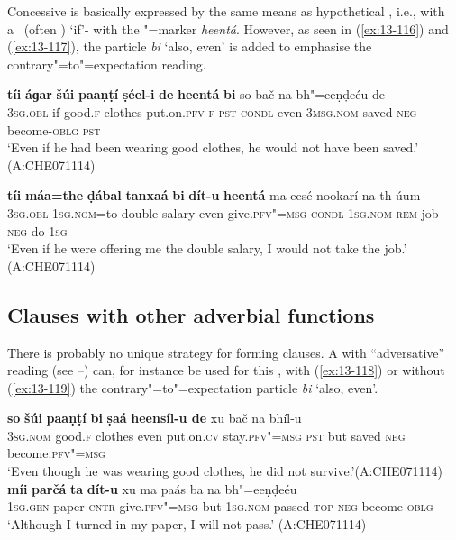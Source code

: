  Concessive  is basically expressed by the same means as hypothetical , i.e., with a~ (often ) `if'- with the "=marker \textit{heentá}. However, as seen in (\ref{ex:13-116}) and (\ref{ex:13-117}), the particle \textit{bi} `also, even' is added to emphasise the contrary"=to"=expectation reading. 
\largerpage
\begin{exe}
\ex
\label{ex:13-116}
\gll \textbf{tíi} \textbf{áɡar} \textbf{šúi} \textbf{paaṇṭí} \textbf{ṣéel-i} \textbf{de} \textbf{heentá} \textbf{ bi} so bač na bh"=eeṇḍeéu de  \\
\textsc{3sg.obl} if good.\textsc{f} clothes put.on.\textsc{pfv-f} \textsc{pst} \textsc{condl}  even \textsc{3msg.nom} saved \textsc{neg} become-\textsc{oblg} \textsc{pst} \\
\glt `Even if he had been wearing good clothes, he would not have been saved.' (A:CHE071114)

\ex
\label{ex:13-117}
\gll \textbf{tíi} \textbf{máa=the} \textbf{ḍábal} \textbf{tanxaá} \textbf{bi} \textbf{dít-u} \textbf{ heentá} ma eesé nookarí na th-úum \\
\textsc{3sg.obl} \textsc{1sg.nom}=to double salary even give.\textsc{pfv"=msg}  \textsc{condl } \textsc{1sg.nom} \textsc{rem} job \textsc{neg} do-\textsc{1sg} \\
\glt `Even if he were offering me the double salary, I would not take the job.' (A:CHE071114)
\end{exe}

\subsection{Clauses with other adverbial functions}
\label{subsec:13-4-5}

 There is probably no unique strategy for forming  clauses. A  with ``adversative'' reading (see --) can, for instance be used for this , with (\ref{ex:13-118}) or without (\ref{ex:13-119}) the contrary"=to"=expectation particle \textit{bi} `also, even'. 

\ea
\label{ex:13-118}
\gll \textbf{so} \textbf{šúi} \textbf{paaṇṭí} \textbf{bi} \textbf{ṣaá} \textbf{heensíl-u de} xu bač na bhíl-u\\
\textsc{3sg.nom} good.\textsc{f} clothes even put.on.\textsc{cv} stay.\textsc{pfv"=msg} \textsc{pst} but saved \textsc{neg} become.\textsc{pfv"=msg}\\
\glt `Even though he was wearing good clothes, he did not survive.'\newline (A:CHE071114)
\ex
\label{ex:13-119}
\gll \textbf{míi} \textbf{parčá} \textbf{ta} \textbf{dít-u} xu ma paás ba na bh"=eeṇḍeéu\\
\textsc{1sg.gen} paper \textsc{cntr} give.\textsc{pfv"=msg} but \textsc{1sg.nom} passed \textsc{top} \textsc{neg} become-\textsc{oblg}\\
\glt `Although I turned in my paper, I will not pass.' (A:CHE071114) 
\z

